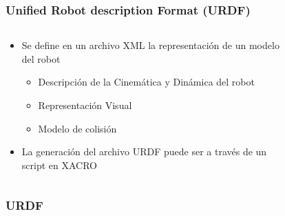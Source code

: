 \begin{frame}
	\frametitle{Unified Robot description Format (URDF)}
 	\begin{columns}
		\begin{column}{0.5\textwidth}
			\begin{itemize}
				\item Se define en un archivo XML la representación de un modelo del robot
				\begin{itemize}
					\item Descripción de la Cinemática y Dinámica del robot
					\item Representación Visual
					\item Modelo de colisión
				\end{itemize}
				\item La generación del archivo URDF puede ser a través de un script en XACRO
			\end{itemize}
		\end{column}
		\begin{column}{0.5\textwidth}
			\begin{figure}[!h]
			\centering
			\end{figure}
		\end{column}
	\end{columns}
	
\end{frame}

\begin{frame}
	\frametitle{URDF}
	
	
\end{frame}

